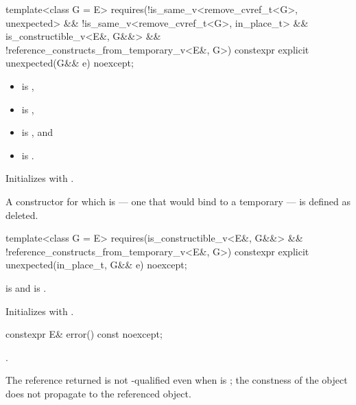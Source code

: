 %
\begin{itemdecl}
template<class G = E>
  requires(!is_same_v<remove_cvref_t<G>, unexpected> &&
           !is_same_v<remove_cvref_t<G>, in_place_t> && is_constructible_v<E&, G&&> &&
           !reference_constructs_from_temporary_v<E&, G>)
constexpr explicit unexpected(G&& e) noexcept;
\end{itemdecl}

\begin{itemdescr}
\pnum
\constraints
\begin{itemize}
\item {} is ,
\item {} is ,
\item {} is , and
\item {} is .
\end{itemize}

\pnum
\effects
Initializes  with .

\pnum
\remarks
A constructor for which  is  — one that would bind  to a temporary — is defined as deleted.
\end{itemdescr}

%
\begin{itemdecl}
template<class G = E>
  requires(is_constructible_v<E&, G&&> && !reference_constructs_from_temporary_v<E&, G>)
constexpr explicit unexpected(in_place_t, G&& e) noexcept;
\end{itemdecl}

\begin{itemdescr}
\pnum
\constraints
{} is  and  is .

\pnum
\effects
Initializes  with .
\end{itemdescr}

%
\begin{itemdecl}
constexpr E& error() const noexcept;
\end{itemdecl}

\begin{itemdescr}
\pnum
\returns
{}.

\pnum
\remarks
The reference returned is not -qualified even when  is ; the constness of the  object does not propagate to the referenced object.
\end{itemdescr}

